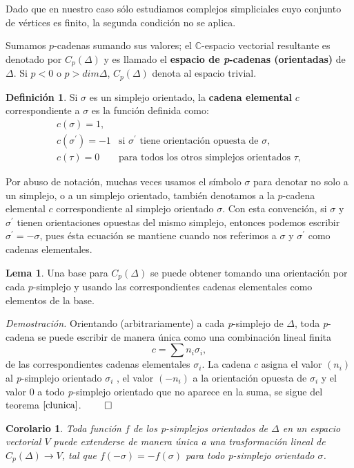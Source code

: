 \documentclass[12pt]{book}
\newtheorem{corollary}[theorem]{Corolario}
\theoremstyle{definition}
\newtheorem{definition}[theorem]{Definición}
\newtheorem{lemma}[theorem]{Lema}
\newcounter{in}
\newcounter{ini}
\begin{document}
{Dado que en nuestro caso sólo estudiamos complejos simpliciales cuyo
conjunto de vértices es finito, la segunda condición no se aplica.

Sumamos $p$-cadenas sumando sus valores; el $\mathbb{C}$-espacio vectorial resultante es
denotado por $C_{p}(\Delta)$ y es llamado el \textbf{espacio de
  \emph{p}-cadenas (orientadas)} de $\Delta$. Si $p<0$ o $p>dim \Delta$,
$C_{p}(\Delta)$ denota al espacio trivial.

\begin{definition}
  Si $\sigma$ es un simplejo orientado, la \textbf{cadena elemental} $c$
  correspondiente a $\sigma$ es la función definida como:
  \[ 
  \begin{array}{cl}
    c(\sigma)=1, & \\
    c(\sigma^{'})=-1 & \mbox{si $\sigma^{'}$ tiene orientación opuesta de $\sigma$}, \\
    c(\tau)=0 & \mbox{para todos los otros simplejos orientados $\tau$}, 
  \end{array}\] 
  \end{definition}

Por abuso de notación, muchas veces usamos el símbolo $\sigma$ para
denotar no solo a un simplejo, o a un simplejo orientado, también
denotamos a la $p$-cadena elemental $c$ correspondiente al simplejo
orientado $\sigma$. Con esta convención, si $\sigma$ y $\sigma^{'}$
tienen orientaciones opuestas del mismo simplejo, entonces podemos
escribir $\sigma^{'}=-\sigma$, pues ésta ecuación se mantiene cuando
nos referimos a $\sigma$ y $\sigma^{'}$ como cadenas elementales.

\begin{lemma}
   Una base para $C_{p}(\Delta)$ se puede obtener
   tomando una orientación por cada $p$-simplejo y usando las
   correspondientes cadenas elementales como elementos de la base.
\end{lemma}

\textit{Demostración.} Orientando (arbitrariamente) a cada
\emph{p}-simplejo de $\Delta$, toda \emph{p}-cadena se puede escribir
de manera única como una combinación lineal finita
$$c=\sum n_{i}\sigma_{i},$$
de las correspondientes cadenas elementales $\sigma_{i}$. La
cadena $c$ asigna el valor $(n_{i})$ al \emph{p}-simplejo orientado
$\sigma_{i}$ , el valor $(-n_{i})$ a la orientación opuesta de
$\sigma_{i}$ y el valor $0$ a todo \emph{p}-simplejo orientado que no
aparece en la suma, se sigue del teorema $\ref{clunica}$. $\qed$

\begin{corollary}
  Toda función $f$ de los p-simplejos orientados de $\Delta$ en
  un espacio vectorial $V$ puede extenderse de manera única a una
  trasformación lineal de $C_{p}(\Delta)\rightarrow V$, tal que $f(-
  \sigma)=-f(\sigma)$ para todo p-simplejo orientado $\sigma$.
\end{corollary}

}
\end{document}

